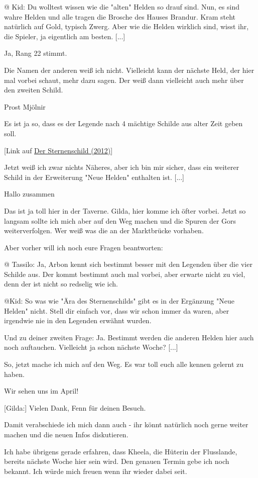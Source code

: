 \documentclass[10pt, a4paper, oneside]{book}
\newcommand{\refstorytext}[1]{\hyperref[Storytext: #1]{#1}}
\begin{document}
\begin{multicols}{2}
@ Kid: Du wolltest wissen wie die "alten" Helden so drauf sind. Nun, es sind wahre Helden und alle tragen die Brosche des Hauses Brandur. Kram steht natürlich auf Gold, typisch Zwerg. Aber wie die Helden wirklich sind, wisst ihr, die Spieler, ja eigentlich am besten. [...]

Ja, Rang 22 stimmt.

Die Namen der anderen weiß ich nicht. Vielleicht kann der nächste Held, der hier mal vorbei schaut, mehr dazu sagen. Der weiß dann vielleicht auch mehr über den zweiten Schild.

Prost Mjölnir

Es ist ja so, dass es der Legende nach 4 mächtige Schilde aus alter Zeit geben soll.

[Link auf \refstorytext{Der Sternenschild (2012)}]

Jetzt weiß ich zwar nichts Näheres, aber ich bin mir sicher, dass ein weiterer Schild in der Erweiterung "Neue Helden" enthalten ist. [...]

Hallo zusammen

Das ist ja toll hier in der Taverne. Gilda, hier komme ich öfter vorbei. Jetzt so langsam sollte ich mich aber auf den Weg machen und die Spuren der Gors weiterverfolgen. Wer weiß was die an der Marktbrücke vorhaben.

Aber vorher will ich noch eure Fragen beantworten:

@ Tassilo: Ja, Arbon kennt sich bestimmt besser mit den Legenden über die vier Schilde aus. Der kommt bestimmt auch mal vorbei, aber erwarte nicht zu viel, denn der ist nicht so redselig wie ich.

@Kid: So was wie "Ära des Sternenschilds" gibt es in der Ergänzung "Neue Helden" nicht. Stell dir einfach vor, dass wir schon immer da waren, aber irgendwie nie in den Legenden erwähnt wurden.

Und zu deiner zweiten Frage: Ja. Bestimmt werden die anderen Helden hier auch noch auftauchen. Vielleicht ja schon nächste Woche? [...]

So, jetzt mache ich mich auf den Weg. Es war toll euch alle kennen gelernt zu haben.

Wir sehen uns im April!

[Gilda:] Vielen Dank, Fenn für deinen Besuch.

Damit verabschiede ich mich dann auch - ihr könnt natürlich noch gerne weiter machen und die neuen Infos diskutieren.

Ich habe übrigens gerade erfahren, dass Kheela, die Hüterin der Flusslande, bereits nächste Woche hier sein wird. Den genauen Termin gebe ich noch bekannt. Ich würde mich freuen wenn ihr wieder dabei seit.


\end{multicols}
\end{document}
